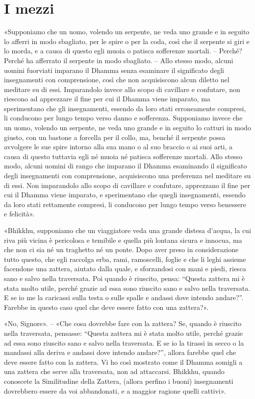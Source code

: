 

\hypertarget{x-i-mezzi}{\section*{I mezzi}}
«Supponiamo che un uomo, volendo un serpente, ne veda uno grande e in
seguito lo afferri in modo sbagliato, per le spire o per la coda, così
che il serpente si giri e lo morda, e a causa di questo egli muoia o
patisca sofferenze mortali. – Perché? Perché ha afferrato il serpente in
modo sbagliato. – Allo stesso modo, alcuni uomini fuorviati imparano il
Dhamma senza esaminare il significato degli insegnamenti con
comprensione, così che non acquisiscono alcun diletto nel meditare su di
essi. Imparandolo invece allo scopo di cavillare e confutare, non
riescono ad apprezzare il fine per cui il Dhamma viene imparato, ma
sperimentano che gli insegnamenti, essendo da loro stati erroneamente
compresi, li conducono per lungo tempo verso danno e sofferenza.
Supponiamo invece che un uomo, volendo un serpente, ne veda uno grande e
in seguito lo catturi in modo giusto, con un bastone a forcella per il
collo, ma, benché il serpente possa avvolgere le sue spire intorno alla
sua mano o al suo braccio o ai suoi arti, a causa di questo tuttavia
egli né muoia né patisca sofferenze mortali. Allo stesso modo, alcuni
uomini di rango che imparano il Dhamma esaminando il significato degli
insegnamenti con comprensione, acquisiscono una preferenza nel meditare
su di essi. Non imparandolo allo scopo di cavillare e confutare,
apprezzano il fine per cui il Dhamma viene imparato, e sperimentano che
quegli insegnamenti, essendo da loro stati rettamente compresi, li
conducono per lungo tempo verso benessere e felicità».


«Bhikkhu, supponiamo che un viaggiatore veda una grande distesa d’acqua,
la cui riva più vicina è pericolosa e temibile e quella più lontana
sicura e innocua, ma che non ci sia né un traghetto né un ponte. Dopo
aver preso in considerazione tutto questo, che egli raccolga erba, rami,
ramoscelli, foglie e che li leghi assieme facendone una zattera, aiutato
dalla quale, e sforzandosi con mani e piedi, riesca sano e salvo nella
traversata. Poi quando è riuscito, pensa: “Questa zattera mi è stata
molto utile, perché grazie ad essa sono riuscito sano e salvo nella
traversata. E se io me la caricassi sulla testa o sulle spalle e andassi
dove intendo andare?”. Farebbe in questo caso quel che deve essere fatto
con una zattera?».


«No, Signore». – «Che cosa dovrebbe fare con la zattera? Se, quando è
riuscito nella traversata, pensasse: “Questa zattera mi è stata molto
utile, perché grazie ad essa sono riuscito sano e salvo nella
traversata. E se io la tirassi in secco o la mandassi alla deriva e
andassi dove intendo andare?”, allora farebbe quel che deve essere fatto
con la zattera. Vi ho così mostrato come il Dhamma somigli a una zattera
che serve alla traversata, non ad attaccarsi. Bhikkhu, quando conoscete
la Similitudine della Zattera, (allora perfino i buoni) insegnamenti
dovrebbero essere da voi abbandonati, e a maggior ragione quelli
cattivi».



